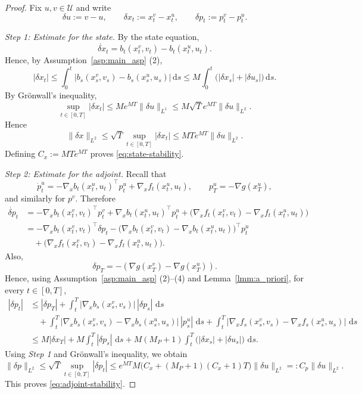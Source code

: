 \documentclass[11pt]{amsart}
\theoremstyle{plain}
\theoremstyle{definition}
\theoremstyle{remark}
\newcommand{\dd}{\,\mathrm{d}}
\begin{document}
\begin{proof}
Fix $u,v\in\mathcal U$ and write
\[
\delta u := v-u,
\qquad
\delta x_t := x_t^v-x_t^u,
\qquad
\delta p_t := p_t^v-p_t^u.
\]

\smallskip

\noindent
\textit{Step 1: Estimate for the state.}
By the state equation,
\[
\dot{\delta x}_t
=
b_t(x_t^v,v_t)-b_t(x_t^u,u_t).
\]
Hence, by Assumption~\ref{asp:main_asp} (2),
\[
|\delta x_t|
\le
\int_0^t |b_s(x_s^v,v_s)-b_s(x_s^u,u_s)|\dd s
\le
M\int_0^t \bigl(|\delta x_s|+|\delta u_s|\bigr)\dd s.
\]
By Gr\"onwall's inequality,
\[
\sup_{t \in [0,T]} |\delta x_t|
\le
M e^{MT}\|\delta u\|_{L^1}
\le M \sqrt{T} e^{MT} \|\delta u\|_{L^2}.
\]
Hence
\[
\| \delta x\|_{L^2} \leq \sqrt{T} \sup_{t \in [0,T]} |\delta x_t| \leq MT e^{MT} \| \delta u\|_{L^2}.
\]
Defining $C_x := M T e^{MT} $ proves \eqref{eq:state-stability}.

\smallskip

\noindent
\textit{Step 2: Estimate for the adjoint.}
Recall that
\[
\dot p_t^u
=
-\nabla_x b_t(x_t^u,u_t)^\top p_t^u + \nabla_x f_t(x_t^u,u_t),
\qquad
p_T^u= - \nabla g(x_T^u),
\]
and similarly for $p^v$. Therefore
\[
\begin{aligned}
\dot{\delta p}_t
&=
-\nabla_x b_t(x_t^v,v_t)^\top p_t^v+\nabla_x b_t(x_t^u,u_t)^\top p_t^u
+ \bigl(\nabla_x f_t(x_t^v,v_t)-\nabla_x f_t(x_t^u,u_t)\bigr) \\
&=
-\nabla_x b_t(x_t^v,v_t)^\top \delta p_t
-\bigl(\nabla_x b_t(x_t^v,v_t)-\nabla_x b_t(x_t^u,u_t)\bigr)^\top p_t^u \\
&\quad
+\bigl(\nabla_x f_t(x_t^v,v_t)-\nabla_x f_t(x_t^u,u_t)\bigr).
\end{aligned}
\]
Also,
\[
\delta p_T
=
- (\nabla g(x_T^v)-\nabla g(x_T^u)).
\]
Hence, using Assumption~\ref{asp:main_asp} (2)--(4) and Lemma~\ref{lmm:a_priori}, for every $t\in[0,T]$,
\[
\begin{aligned}
|\delta p_t|
&\le
|\delta p_T|
+
\int_t^T |\nabla_x b_s(x_s^v,v_s)|\,|\delta p_s|\,\dd s \\
&\quad
+
\int_t^T
\bigl|
\nabla_x b_s(x_s^v,v_s)-\nabla_x b_s(x_s^u,u_s)
\bigr|\,|p_s^u|\,\dd s
+
\int_t^T
\bigl|
\nabla_x f_s(x_s^v,v_s)-\nabla_x f_s(x_s^u,u_s)
\bigr|\,\dd s \\
&\le
M|\delta x_T|
+
M\int_t^T |\delta p_s|\,\dd s
+
M(M_P+1)\int_t^T \bigl(|\delta x_s|+|\delta u_s|\bigr)\,\dd s.
\end{aligned}
\]
Using \textit{Step 1} and Gr\"onwall's inequality, we obtain
\[
\| \delta p\|_{L^2} \leq \sqrt{T} \sup_{t \in [0,T]} |\delta p_t|
\le
e^{MT} M \Big(C_x + (M_P+1) (C_x +1)T  \Big) \|\delta u\|_{L^2} =: C_p \|\delta u\|_{L^2}.
\]
This proves \eqref{eq:adjoint-stability}.
\end{proof}
\end{document}
